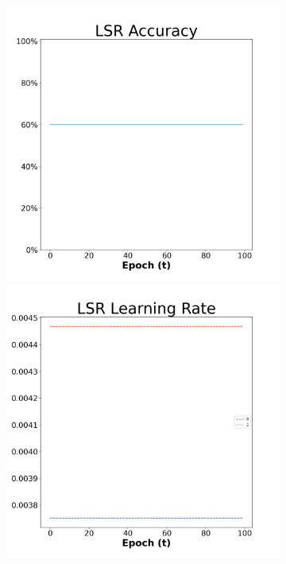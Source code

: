 \begin{figure}[H]
    \centering %
\begin{subfigure}{0.3\textwidth}
  \includegraphics[width=\linewidth]{images/exper1/NSP/LSR_0.01_acc.png}
    \includegraphics[width=\linewidth]{images/exper1/NSP/LSR_0.01_lr.png}

\end{subfigure}
\end{figure}
